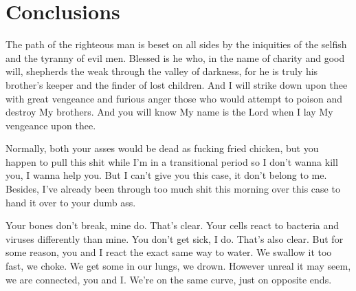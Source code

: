 \section{Conclusions}

The path of the righteous man is beset on all sides by the iniquities of the selfish and the tyranny of evil men. Blessed is he who, in the name of charity and good will, shepherds the weak through the valley of darkness, for he is truly his brother's keeper and the finder of lost children. And I will strike down upon thee with great vengeance and furious anger those who would attempt to poison and destroy My brothers. And you will know My name is the Lord when I lay My vengeance upon thee.

Normally, both your asses would be dead as fucking fried chicken, but you happen to pull this shit while I'm in a transitional period so I don't wanna kill you, I wanna help you. But I can't give you this case, it don't belong to me. Besides, I've already been through too much shit this morning over this case to hand it over to your dumb ass.

Your bones don't break, mine do. That's clear. Your cells react to bacteria and viruses differently than mine. You don't get sick, I do. That's also clear. But for some reason, you and I react the exact same way to water. We swallow it too fast, we choke. We get some in our lungs, we drown. However unreal it may seem, we are connected, you and I. We're on the same curve, just on opposite ends.

